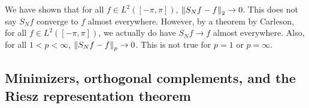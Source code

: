 \documentclass[a4paper]{article}
\begin{document}
\begin{remark}
We have shown that for all $f \in L^2([-\pi, \pi])$,
$\left\lVert S_N f - f\right\rVert_2 \to 0$. This does not say $S_N f$ 
converge to $f$ almost everywhere. However, by a theorem 
by Carleson, for all $f \in L^2([-\pi, \pi])$, 
we actually do have $S_N f \to f$ almost everywhere.
Also, for all $1 < p < \infty$, $\left\lVert S_N f - f\right\rVert_p \to 0$.
This is not true for $p = 1$ or $p = \infty$.
\end{remark}

\subsection{Minimizers, orthogonal complements, and the 
Riesz representation theorem}
\end{document}
